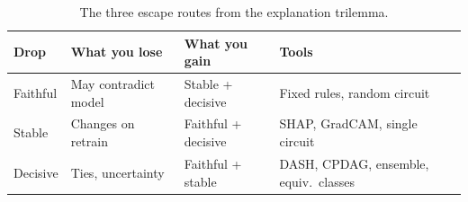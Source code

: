 \begin{table}[t]
\centering
\caption{The three escape routes from the explanation trilemma.}
\label{tab:escape-routes}
\begin{tabular}{llll}
\toprule
Drop & What you lose & What you gain & Tools \\
\midrule
Faithful & May contradict model & Stable + decisive & Fixed rules, random circuit \\
Stable   & Changes on retrain   & Faithful + decisive & SHAP, GradCAM, single circuit \\
Decisive & Ties, uncertainty    & Faithful + stable  & DASH, CPDAG, ensemble, equiv.\ classes \\
\bottomrule
\end{tabular}
\end{table}
